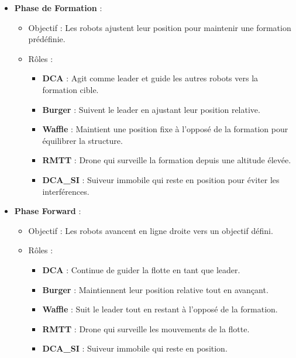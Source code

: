 \documentclass[a4paper,12pt]{article}
\begin{document}
\begin{itemize}
    \item \textbf{Phase de Formation} :
    \begin{itemize}
        \item Objectif : Les robots ajustent leur position pour maintenir une formation prédéfinie.
        \item Rôles :
        \begin{itemize}
            \item \textbf{DCA} : Agit comme leader et guide les autres robots vers la formation cible.
            \item \textbf{Burger} : Suivent le leader en ajustant leur position relative.
            \item \textbf{Waffle} : Maintient une position fixe à l'opposé de la formation pour équilibrer la structure.
            \item \textbf{RMTT} : Drone qui surveille la formation depuis une altitude élevée.
            \item \textbf{DCA\_SI} : Suiveur immobile qui reste en position pour éviter les interférences.
        \end{itemize}
    \end{itemize}

    \item \textbf{Phase Forward} :
    \begin{itemize}
        \item Objectif : Les robots avancent en ligne droite vers un objectif défini.
        \item Rôles :
        \begin{itemize}
            \item \textbf{DCA} : Continue de guider la flotte en tant que leader.
            \item \textbf{Burger} : Maintiennent leur position relative tout en avançant.
            \item \textbf{Waffle} : Suit le leader tout en restant à l'opposé de la formation.
            \item \textbf{RMTT} : Drone qui surveille les mouvements de la flotte.
            \item \textbf{DCA\_SI} : Suiveur immobile qui reste en position.
        \end{itemize}
    \end{itemize}


\end{itemize}
\end{document}
